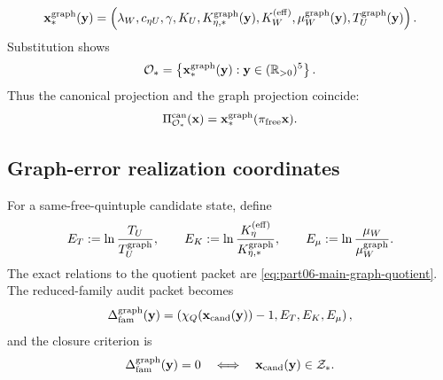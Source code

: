 \begin{equation}
\label{eq:part06-x-graph-def}
\mathbf x_*^{\rm graph}(\mathbf y)
=
\left(
\lambda_W,
 c_{\eta U},
 \gamma,
 K_U,
 K_{\eta,*}^{\rm graph}(\mathbf y),
 K_W^{(\mathrm{eff})},
 \mu_W^{\rm graph}(\mathbf y),
 T_U^{\rm graph}(\mathbf y)
\right).
\end{equation}
Substitution shows
\begin{equation}
\label{eq:part06-Ostar-graph}
\mathcal O_*=
\left\{
\mathbf x_*^{\rm graph}(\mathbf y):\mathbf y\in(\mathbb R_{>0})^5
\right\}.
\end{equation}
Thus the canonical projection and the graph projection coincide:
\begin{equation}
\label{eq:part06-can-equals-graph}
\Pi_{\mathcal O_*}^{\rm can}(\mathbf x)
=
\mathbf x_*^{\rm graph}(\pi_{\rm free}\mathbf x).
\end{equation}

\subsection{Graph-error realization coordinates}
\label{subsec:part06-graph-error-realization-coordinates}

For a same-free-quintuple candidate state, define
\begin{equation}
\label{eq:part06-graph-errors-def}
E_T:=\ln\frac{T_U}{T_U^{\rm graph}},
\qquad
E_K:=\ln\frac{K_\eta^{(\mathrm{eff})}}{K_{\eta,*}^{\rm graph}},
\qquad
E_\mu:=\ln\frac{\mu_W}{\mu_W^{\rm graph}}.
\end{equation}
The exact relations to the quotient packet are \eqref{eq:part06-main-graph-quotient}.  The reduced-family audit packet becomes
\begin{equation}
\label{eq:part06-graph-family-packet}
\Delta_{\rm fam}^{\rm graph}(\mathbf y)
=
\left(
\chi_Q(\mathbf x_{\rm cand}(\mathbf y))-1,
E_T,
E_K,
E_\mu
\right),
\end{equation}
and the closure criterion is
\begin{equation}
\label{eq:part06-graph-family-zero}
\Delta_{\rm fam}^{\rm graph}(\mathbf y)=0
\quad\Longleftrightarrow\quad
\mathbf x_{\rm cand}(\mathbf y)\in\mathcal Z_*.
\end{equation}


